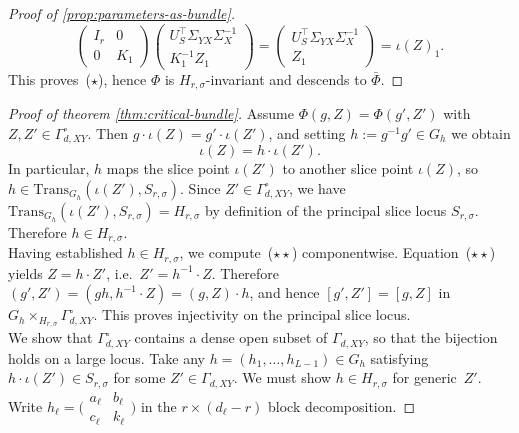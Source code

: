 \documentclass{article}
\theoremstyle{definition}
\begin{document}
\begin{proof}[Proof of \ref{prop:parameters-as-bundle}]
\[
\begin{pmatrix} I_r & 0 \\ 0 & K_1 \end{pmatrix}
\begin{pmatrix} U_S^\top \Sigma_{YX} \Sigma_X^{-1} \\ K_1^{-1} Z_1 \end{pmatrix}
= \begin{pmatrix} U_S^\top \Sigma_{YX} \Sigma_X^{-1} \\ Z_1 \end{pmatrix}
= \iota(Z)_1.
\]
This proves~($\star$), hence $\Phi$ is $H_{r,\sigma}$-invariant and descends to $\bar\Phi$.
\end{proof}
\begin{proof}[Proof of theorem \ref{thm:critical-bundle}]\label{proof:critical-bundle}
Assume $\Phi(g, Z) = \Phi(g', Z')$ with $Z, Z' \in \Gamma_{d,XY}^{\circ}$.  Then $g \cdot \iota(Z) = g' \cdot \iota(Z')$, and setting $h := g^{-1} g' \in G_h$ we obtain
\begin{equation}\tag{$\star\star$}
\iota(Z) = h \cdot \iota(Z').
\end{equation}
In particular, $h$ maps the slice point $\iota(Z')$ to another slice point $\iota(Z)$, so $h \in \mathrm{Trans}_{G_h}(\iota(Z'), S_{r,\sigma})$.  Since $Z' \in  \Gamma_{d,XY}^{\circ}$, we have $\mathrm{Trans}_{G_h}(\iota(Z'), S_{r,\sigma}) = H_{r,\sigma}$ by definition of the principal slice locus $S_{r,\sigma}$.  Therefore $h \in H_{r,\sigma}$.
\\
\noindent
Having established $h \in H_{r,\sigma}$, we compute~($\star\star$) componentwise. Equation~($\star\star$) yields $Z = h \cdot Z'$, i.e.\ $Z' = h^{-1} \cdot Z$.  Therefore $(g', Z') = (gh, h^{-1} \cdot Z) = (g, Z) \cdot h$, and hence $[g', Z'] = [g, Z]$ in $G_h \times_{H_{r,\sigma}} \Gamma_{d,XY}^{\circ}$.  This proves injectivity on the principal slice locus.
\\
\medskip
\noindent
We show that $\Gamma_{d,XY}^{\circ}$ contains a dense open subset of $\Gamma_{d,XY}$, so that the bijection holds on a large locus.  Take any $h = (h_1, \dots, h_{L-1}) \in G_h$ satisfying $h \cdot \iota(Z') \in S_{r,\sigma}$ for some $Z' \in \Gamma_{d,XY}$.  We must show $h \in H_{r,\sigma}$ for generic~$Z'$. Write $h_\ell = \bigl(\begin{smallmatrix} a_\ell & b_\ell \\ c_\ell & k_\ell \end{smallmatrix}\bigr)$ in the $r \times (d_\ell - r)$ block decomposition.
\noindent

\end{proof}
\end{document}
